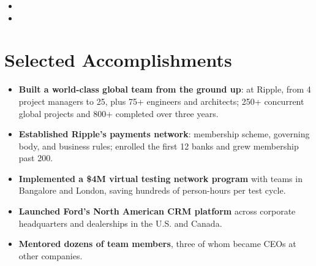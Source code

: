 \documentclass[11pt,letterpaper,sans]{moderncv}
\begin{document}
\begin{itemize}
\item{}

\vspace{3pt}

\item{}

\end{itemize}


\section{Selected Accomplishments}
\vspace{1pt}
\begin{itemize}
\item {\textbf{Built a world-class global team from the ground up}: at Ripple, from 4 project managers to 25, plus 75+ engineers and architects; 250+ concurrent global projects and 800+ completed over three years.}
\item {\textbf{Established Ripple's payments network}: membership scheme, governing body, and business rules; enrolled the first 12 banks and grew membership past 200.}
\item {\textbf{Implemented a \$4M virtual testing network program} with teams in Bangalore and London, saving hundreds of person-hours per test cycle.}
\item {\textbf{Launched Ford's North American CRM platform} across corporate headquarters and dealerships in the U.S. and Canada.}
\item {\textbf{Mentored dozens of team members}, three of whom became CEOs at other companies.}
\end{itemize}
\end{document}
